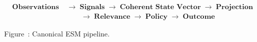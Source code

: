 
\begin{center}
\small
\[
\begin{aligned}
\textbf{Observations} &\;\longrightarrow\; \textbf{Signals} \;\longrightarrow\; \textbf{Coherent State Vector} \;\longrightarrow\; \textbf{Projection} \\
&\qquad\;\longrightarrow\; \textbf{Relevance} \;\longrightarrow\; \textbf{Policy} \;\longrightarrow\; \textbf{Outcome}
\end{aligned}
\]
\end{center}

\vspace{-0.5em}
\begin{center}
\small Figure~\thefigure: Canonical ESM pipeline.
\label{fig:esm-canonical-pipeline}
\end{center}
